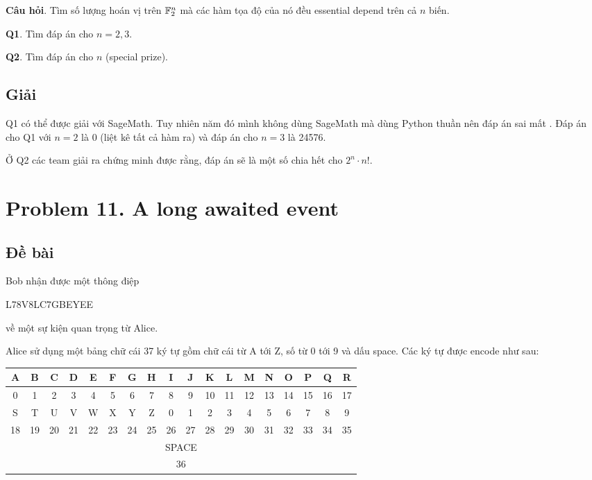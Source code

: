 \textbf{Câu hỏi}. Tìm số lượng hoán vị trên $\mathbb{F}_2^n$ mà các hàm tọa độ của nó đều essential depend trên cả $n$ biến.

\textbf{Q1}. Tìm đáp án cho $n=2, 3$.

\textbf{Q2}. Tìm đáp án cho $n$ (special prize).

\subsection*{Giải}

Q1 có thể được giải với SageMath. Tuy nhiên năm đó mình không dùng SageMath mà dùng Python thuần nên đáp án sai mất . Đáp án cho Q1 với $n=2$ là 0 (liệt kê tất cả hàm ra) và đáp án cho $n=3$ là 24576.

Ở Q2 các team giải ra chứng minh được rằng, đáp án sẽ là một số chia hết cho $2^n \cdot n!$.

\section*{Problem 11. A long awaited event}

\subsection*{Đề bài}

Bob nhận được một thông điệp

L78V8LC7GBEYEE

về một sự kiện quan trọng từ Alice.

Alice sử dụng một bảng chữ cái 37 ký tự gồm chữ cái từ A tới Z, số từ 0 tới 9 và dấu space. Các ký tự được encode như sau:

\begin{table}[ht]
    \centering
    \begin{tabular}{|c|c|c|c|c|c|c|c|c|c|c|c|c|c|c|c|c|c|}
        \hline
        A & B & C & D & E & F & G & H & I & J & K & L & M & N & O & P & Q & R \\ \hline
        0 & 1 & 2 & 3 & 4 & 5 & 6 & 7 & 8 & 9 & 10 & 11 & 12 & 13 & 14 & 15 & 16 & 17 \\ \hline
        \hline
        S & T & U & V & W & X & Y & Z & 0 & 1 & 2 & 3 & 4 & 5 & 6 & 7 & 8 & 9 \\ \hline 
        18 & 19 & 20 & 21 & 22 & 23 & 24 & 25 & 26 & 27 & 28 & 29 & 30 & 31 & 32 & 33 & 34 & 35 \\ \hline
        \hline
        \multicolumn{18}{|c|}{SPACE} \\ \hline
        \multicolumn{18}{|c|}{36} \\ \hline
    \end{tabular}
\end{table}

